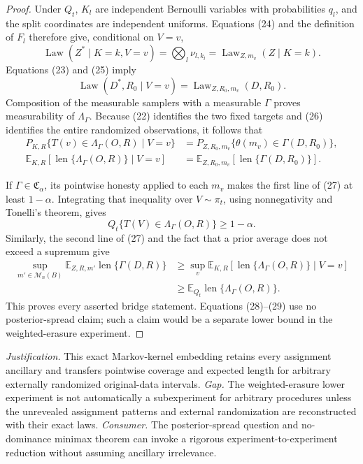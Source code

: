 \documentclass{article}
\begin{document}
\begin{proof}
Under \(Q_t\), \(K_l\) are independent Bernoulli variables with
probabilities \(q_l\), and the split coordinates are independent
uniforms.  Equations (24) and the definition of \(F_l\) therefore give,
conditional on \(V=v\),
\[
 \operatorname{Law}(Z^*\mid K=k,V=v)
 =\bigotimes_l\nu_{l,k_l}
 =\operatorname{Law}_{Z,m_v}(Z\mid K=k).
\tag{25}
\]
Equations (23) and (25) imply
\[
 \operatorname{Law}(D^*,R_0\mid V=v)
 =\operatorname{Law}_{Z,R_0,m_v}(D,R_0).
\tag{26}
\]
Composition of the measurable samplers with a measurable
\(\Gamma\) proves measurability of \(\Lambda_\Gamma\).
Because (22) identifies the two fixed targets and (26) identifies the
entire randomized observations, it follows that
\[
\begin{aligned}
 P_{K,R}\{T(v)\in\Lambda_\Gamma(O,R)\mid V=v\}
 &=P_{Z,R_0,m_v}\{\theta(m_v)\in\Gamma(D,R_0)\},\\
 \mathbb E_{K,R}[\operatorname{len}\{\Lambda_\Gamma(O,R)\}\mid V=v]
 &=\mathbb E_{Z,R_0,m_v}[\operatorname{len}\{\Gamma(D,R_0)\}].
\end{aligned}
\tag{27}
\]

If \(\Gamma\in\mathfrak C_\alpha\), its pointwise honesty applied to
each \(m_v\) makes the first line of (27) at least \(1-\alpha\).
Integrating that inequality over \(V\sim\pi_t\), using nonnegativity
and Tonelli's theorem, gives
\[
 Q_t\{T(V)\in\Lambda_\Gamma(O,R)\}\ge1-\alpha.
\tag{28}
\]
Similarly, the second line of (27) and the fact that a prior average
does not exceed a supremum give
\[
\begin{aligned}
 \sup_{m'\in\mathcal M_n(B)}
 \mathbb E_{Z,R,m'}\operatorname{len}\{\Gamma(D,R)\}
 &\ge\sup_v\mathbb E_{K,R}
 [\operatorname{len}\{\Lambda_\Gamma(O,R)\}\mid V=v]\\
 &\ge\mathbb E_{Q_t}
 \operatorname{len}\{\Lambda_\Gamma(O,R)\}.
\end{aligned}
\tag{29}
\]
This proves every asserted bridge statement.  Equations (28)--(29)
use no posterior-spread claim; such a claim would be a separate lower
bound in the weighted-erasure experiment.
\end{proof}
\par\smallskip\noindent \textit{Justification.} This exact Markov-kernel embedding retains every assignment ancillary and transfers pointwise coverage and expected length for arbitrary externally randomized original-data intervals. \textit{Gap.} The weighted-erasure lower experiment is not automatically a subexperiment for arbitrary procedures unless the unrevealed assignment patterns and external randomization are reconstructed with their exact laws. \textit{Consumer.} The posterior-spread question and no-dominance minimax theorem can invoke a rigorous experiment-to-experiment reduction without assuming ancillary irrelevance.
\end{document}
